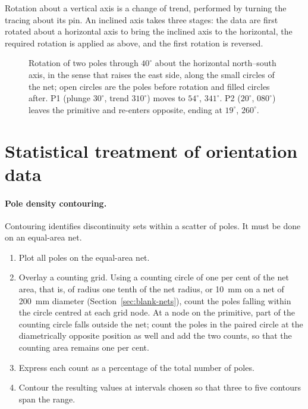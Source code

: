 Rotation about a vertical axis is a change of trend, performed by
turning the tracing about its pin. An inclined axis takes three stages: the
data are first rotated about a horizontal axis to bring the inclined axis to
the horizontal, the required rotation is applied as above, and the first
rotation is reversed.

\begin{figure}[htbp]
\centering
{}
\caption{Rotation of two poles through $40^\circ$ about the horizontal north--south axis, in the sense that raises the east side, along the small circles of the net; open circles are the poles before rotation and filled circles after. P1 (plunge $30^\circ$, trend $310^\circ$) moves to $54^\circ$, $341^\circ$. P2 ($20^\circ$, $080^\circ$) leaves the primitive and re-enters opposite, ending at $19^\circ$, $260^\circ$.}
\label{fig:construct-rotation}
\end{figure}

\section{Statistical treatment of orientation data}
\label{sec:statistical-treatment-of-orientation-data}

\paragraph{Pole density contouring.}
Contouring identifies discontinuity sets within a scatter of poles. It must be
done on an equal-area net.

\begin{enumerate}
  \item Plot all poles on the equal-area net.
  \item Overlay a counting grid. Using a counting circle of one per cent of
        the net area, that is, of radius one tenth of the net radius, or
        10~mm on a net of 200~mm diameter (Section~\ref{sec:blank-nets}),
        count the poles falling within the circle centred at
        each grid node. At a node on the primitive, part of the counting
        circle falls outside the net; count the poles in the paired circle
        at the diametrically opposite position as well and add the two
        counts, so that the counting area remains one per cent.
  \item Express each count as a percentage of the total number of poles.
  \item Contour the resulting values at intervals chosen so that three to
        five contours span the range.
\end{enumerate}

